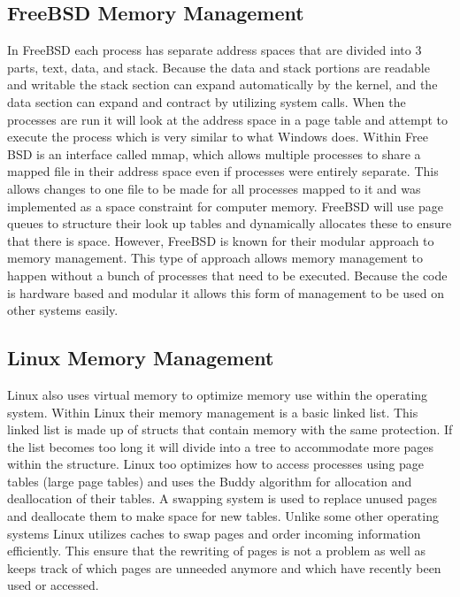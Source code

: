 \documentclass[onecolumn, draftclsnofoot,10pt, compsoc]{IEEEtran}
\begin{document}
\subsection{FreeBSD Memory Management}
In FreeBSD each process has separate address spaces that are divided into 3 parts, text, data, and stack\cite{10}. Because the data and stack portions are readable and writable the stack section can expand automatically by the kernel, and the data section can expand and contract by utilizing system calls. When the processes are run it will look at the address space in a page table and attempt to execute the process which is very similar to what Windows does. Within Free BSD is an interface called mmap, which allows multiple processes to share a mapped file in their address space even if processes were entirely separate\cite{1}. This allows changes to one file to be made for all processes mapped to it and was implemented as a space constraint for computer memory. FreeBSD will use page queues to structure their look up tables and dynamically allocates these to ensure that there is space. However, FreeBSD is known for their modular approach to memory management. This type of approach allows memory management to happen without a bunch of processes that need to be executed. Because the code is hardware based and modular it allows this form of management to be used on other systems easily.
\subsection{Linux Memory Management}
Linux also uses virtual memory to optimize memory use within the operating system. Within Linux their memory management is a basic linked list. This linked list is made up of structs that contain memory with the same protection. If the list becomes too long it will divide into a tree to accommodate more pages within the structure. Linux too optimizes how to access processes using page tables (large page tables) and uses the Buddy algorithm for allocation and deallocation of their tables. A swapping system is used to replace unused pages and deallocate them to make space for new tables. Unlike some other operating systems Linux utilizes caches to swap pages and order incoming information efficiently. This ensure that the rewriting of pages is not a problem as well as keeps track of which pages are unneeded anymore and which have recently been used or accessed\cite{11}.
\end{document}
